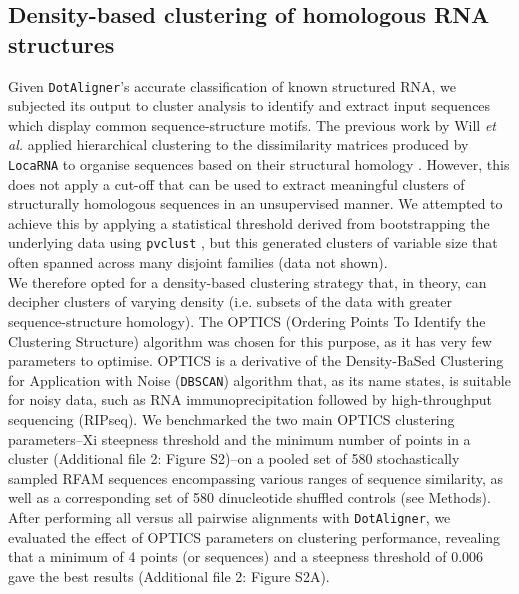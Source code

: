 \documentclass{bmcart}
\newcommand\dotaligner{\texttt{DotAligner}}
\newcommand\locarna{\texttt{LocaRNA}}
\begin{document}
\subsection*{Density-based clustering of homologous RNA structures}

Given \dotaligner{}'s accurate classification of known structured RNA, we subjected its
output to cluster analysis to identify and extract input sequences which display common
sequence-structure motifs. The previous work by Will \textit{et al.} applied hierarchical clustering 
to the dissimilarity matrices produced by \locarna{} to organise sequences based on their
structural homology \cite{Will17432929}. However, this does not apply a cut-off that can be used 
to extract meaningful clusters of structurally homologous sequences in an unsupervised 
manner. We attempted to achieve this by applying a statistical threshold derived from 
bootstrapping the underlying data using \texttt{pvclust} \cite{suzuki2006pvclust}, but this
generated clusters of variable size that often spanned across many disjoint families 
(data not shown).\\


We therefore opted for a density-based clustering strategy that, in theory, can decipher 
clusters of varying density (i.e. subsets of the data with greater sequence-structure homology). 
The OPTICS (Ordering Points To Identify the Clustering Structure) algorithm \cite{ankerst99ordering}
was chosen for this purpose, as it has very few parameters to optimise. 
OPTICS is a derivative of the Density-BaSed Clustering for Application with Noise
 (\texttt{DBSCAN}) \cite{ester1996density} algorithm that, as its name states, is suitable 
 for noisy data, such as RNA immunoprecipitation followed by high-throughput sequencing 
 (RIPseq). We  benchmarked the two main OPTICS clustering parameters--Xi steepness threshold 
and the minimum number of points in a cluster (Additional file 2: Figure S2)--on 
a pooled set of 580 stochastically sampled RFAM sequences encompassing various ranges of sequence similarity, 
as well as a corresponding set of 580 dinucleotide shuffled controls (see Methods). 
After performing all versus all pairwise alignments with \dotaligner{}, 
we evaluated the effect of OPTICS parameters on clustering performance, 
revealing that a minimum of 4 points (or sequences) and a steepness threshold of 0.006 
gave the best results (Additional file 2: Figure S2A). \\
\end{document}
